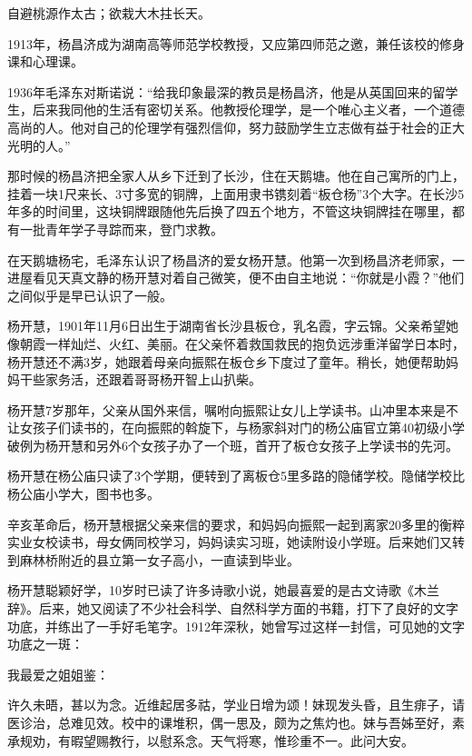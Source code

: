 \documentclass[../../dazhuan.tex]{subfiles}
\begin{document}
\begin{couplet}
自避桃源作太古；欲栽大木拄长天。
\end{couplet}

1913年，杨昌济成为湖南高等师范学校教授，又应第四师范之邀，兼任该校的修身课和心理课。

1936年毛泽东对斯诺说：“给我印象最深的教员是杨昌济，他是从英国回来的留学生，后来我同他的生活有密切关系。他教授伦理学，是一个唯心主义者，一个道德高尚的人。他对自己的伦理学有强烈信仰，努力鼓励学生立志做有益于社会的正大光明的人。”

那时候的杨昌济把全家人从乡下迁到了长沙，住在天鹅塘。他在自己寓所的门上，挂着一块1尺来长、3寸多宽的铜牌，上面用隶书镌刻着“板仓杨”3个大字。在长沙5年多的时间里，这块铜牌跟随他先后换了四五个地方，不管这块铜牌挂在哪里，都有一批青年学子寻踪而来，登门求教。

在天鹅塘杨宅，毛泽东认识了杨昌济的爱女杨开慧。他第一次到杨昌济老师家，一进屋看见天真文静的杨开慧对着自己微笑，便不由自主地说：“你就是小霞？”他们之间似乎是早已认识了一般。

杨开慧，1901年11月6日出生于湖南省长沙县板仓，乳名霞，字云锦。父亲希望她像朝霞一样灿烂、火红、美丽。在父亲怀着救国救民的抱负远涉重洋留学日本时，杨开慧还不满3岁，她跟着母亲向振熙在板仓乡下度过了童年。稍长，她便帮助妈妈干些家务活，还跟着哥哥杨开智上山扒柴。

杨开慧7岁那年，父亲从国外来信，嘱咐向振熙让女儿上学读书。山冲里本来是不让女孩子们读书的，在向振熙的斡旋下，与杨家斜对门的杨公庙官立第40初级小学破例为杨开慧和另外6个女孩子办了一个班，首开了板仓女孩子上学读书的先河。

杨开慧在杨公庙只读了3个学期，便转到了离板仓5里多路的隐储学校。隐储学校比杨公庙小学大，图书也多。

辛亥革命后，杨开慧根据父亲来信的要求，和妈妈向振熙一起到离家20多里的衡粹实业女校读书，母女俩同校学习，妈妈读实习班，她读附设小学班。后来她们又转到麻林桥附近的县立第一女子高小，一直读到毕业。

杨开慧聪颖好学，10岁时已读了许多诗歌小说，她最喜爱的是古文诗歌《木兰辞》。后来，她又阅读了不少社会科学、自然科学方面的书籍，打下了良好的文字功底，并练出了一手好毛笔字。1912年深秋，她曾写过这样一封信，可见她的文字功底之一斑：

\begin{xquote}
\noindent 我最爱之姐姐鉴：

许久未晤，甚以为念。近维起居多祜，学业日增为颂！妹现发头昏，且生痱子，请医诊治，总难见效。校中的课堆积，偶一思及，颇为之焦灼也。妹与吾姊至好，素承规劝，有暇望赐教行，以慰系念。天气将寒，惟珍重不一。此问大安。


\end{xquote}
\end{document}

